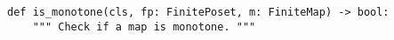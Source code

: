 \begin{verbatim}
def is_monotone(cls, fp: FinitePoset, m: FiniteMap) -> bool:
    """ Check if a map is monotone. """
\end{verbatim}